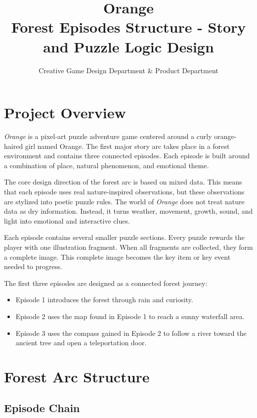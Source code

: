 \documentclass[12pt]{article}
\title{\textbf{Orange}\\
\large Forest Episodes Structure - Story and Puzzle Logic Design}
\author{Creative Game Design Department \& Product Department}
\date{}
\begin{document}
\maketitle

\section{Project Overview}

\textit{Orange} is a pixel-art puzzle adventure game centered around a curly orange-haired girl named Orange. The first major story arc takes place in a forest environment and contains three connected episodes. Each episode is built around a combination of place, natural phenomenon, and emotional theme.

The core design direction of the forest arc is based on mixed data. This means that each episode uses real nature-inspired observations, but these observations are stylized into poetic puzzle rules. The world of \textit{Orange} does not treat nature data as dry information. Instead, it turns weather, movement, growth, sound, and light into emotional and interactive clues.

Each episode contains several smaller puzzle sections. Every puzzle rewards the player with one illustration fragment. When all fragments are collected, they form a complete image. This complete image becomes the key item or key event needed to progress.

The first three episodes are designed as a connected forest journey:

\begin{itemize}[leftmargin=*]
    \item Episode 1 introduces the forest through rain and curiosity.
    \item Episode 2 uses the map found in Episode 1 to reach a sunny waterfall area.
    \item Episode 3 uses the compass gained in Episode 2 to follow a river toward the ancient tree and open a teleportation door.
\end{itemize}

\section{Forest Arc Structure}

\subsection{Episode Chain}
\end{document}
